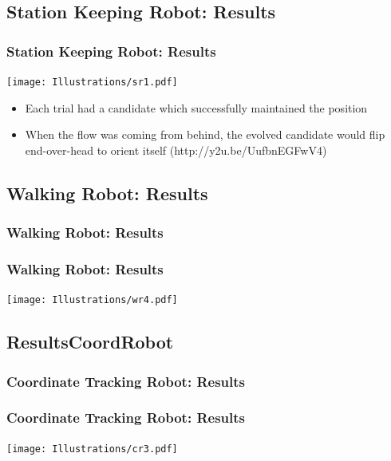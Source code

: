 \documentclass{beamer}
\begin{document}
\subsection{Station Keeping Robot: Results} %
\begin{frame}
  \frametitle{Station Keeping Robot: Results}
  \begin{center}
  \texttt{[image: Illustrations/sr1.pdf]}
       \\
    \end{center}
  \begin{itemize}
    \item Each trial had a candidate which successfully maintained the position
        \item When the flow was coming from behind, the evolved candidate would flip end-over-head to orient itself (http://y2u.be/UufbnEGFwV4)
  \end{itemize}
\end{frame}

\subsection{Walking Robot: Results}
\begin{frame}
  \frametitle{Walking Robot: Results}
\end{frame}

\begin{frame}
  \frametitle{Walking Robot: Results}

\begin{center}
 \texttt{[image: Illustrations/wr4.pdf]}
       \\
\end{center}
\end{frame}

\subsection{ResultsCoordRobot}
\begin{frame}
  \frametitle{Coordinate Tracking Robot: Results}
\end{frame}

\begin{frame}
  \frametitle{Coordinate Tracking Robot: Results}
\begin{center}
 \texttt{[image: Illustrations/cr3.pdf]}
       \\
\end{center}
\end{frame}
\end{document}
